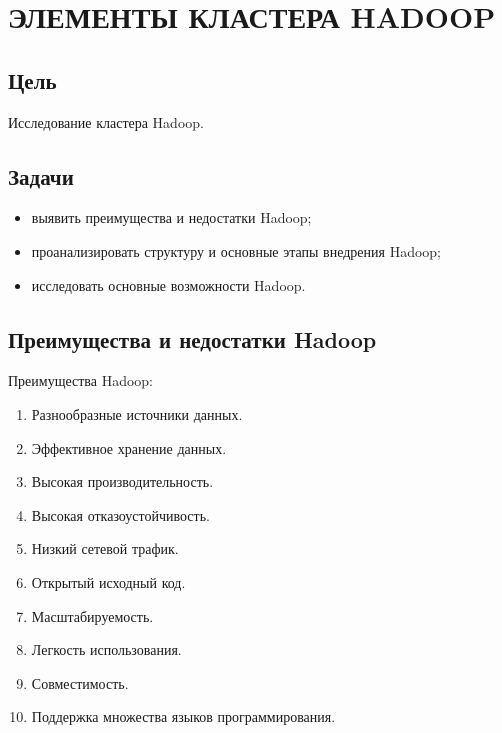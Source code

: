 



\usepackage{tabularx}
\usepackage{multicol}

\newcommand{\labnumber}{1} %



\graphicspath{{figures/}}


\Ukrainian


\addtocounter{page}{1}

\section{ЭЛЕМЕНТЫ КЛАСТЕРА HADOOP}
\subsection*{Цель}
Исследование кластера Hadoop.
\subsection*{Задачи}
\begin{itemize}
    \item выявить преимущества и недостатки Hadoop;
    \item проанализировать структуру и основные этапы внедрения Hadoop;
    \item исследовать основные возможности Hadoop.
\end{itemize}

\subsection{Преимущества и недостатки Hadoop}
Преимущества Hadoop:
\begin{enumerate}
    \item Разнообразные источники данных.
    \item Эффективное хранение данных.
    \item Высокая производительность.
    \item Высокая отказоустойчивость.
    \item Низкий сетевой трафик.
    \item Открытый исходный код.
    \item Масштабируемость.
    \item Легкость использования.
    \item Совместимость.
    \item Поддержка множества языков программирования.
\end{enumerate}

